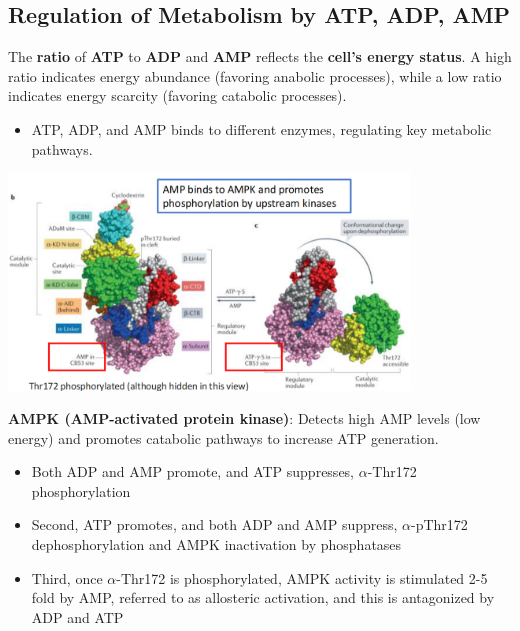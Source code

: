 \documentclass[10pt]{article}
\begin{document}
\subsection*{Regulation of Metabolism by ATP, ADP, AMP}
The \textbf{ratio} of \textbf{ATP} to \textbf{ADP} and \textbf{AMP} reflects the \textbf{cell's energy status}.  A high ratio indicates energy abundance (favoring anabolic processes), while a low ratio indicates energy scarcity (favoring catabolic processes).
\begin{itemize}
	\item ATP, ADP, and AMP binds to different enzymes, regulating key metabolic pathways.
\end{itemize}
\begin{center}
    \includegraphics*[width=0.8\textwidth]{L2_8.png}
\end{center}
\textbf{AMPK (AMP-activated protein kinase)}: Detects high AMP levels (low energy) and promotes catabolic pathways to increase ATP generation.
\begin{itemize}
	\item Both ADP and AMP promote, and ATP suppresses, $\alpha$-Thr172 phosphorylation
	\item Second, ATP promotes, and both ADP and AMP suppress, $\alpha$-pThr172 dephosphorylation and AMPK inactivation by phosphatases
	\item Third, once $\alpha$-Thr172 is phosphorylated, AMPK activity is stimulated 2-5 fold by AMP, referred to as allosteric activation, and this is antagonized by ADP and ATP
\end{itemize}
\end{document}

